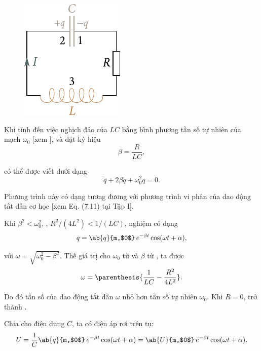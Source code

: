 \begin{figure}[t]
	\begin{center}
		\includegraphics[scale=1]{figures/ch_13/fig_13_3.pdf}
		\caption[]{}
		\label{fig:13_3}
	\end{center}
	\vspace{-0.8cm}
\end{figure}

Khi tính đến việc nghịch đảo của $LC$ bằng bình phương tần số tự nhiên của mạch $\omega_0$ [xem ], và đặt ký hiệu
\begin{equation}\label{eq:13_12}
    \beta = \frac{R}{LC},
\end{equation}

\noindent
{} có thể được viết dưới dạng
\begin{equation}\label{eq:13_13}
    \ddot{q} + 2 \beta \dot{q} + \omega_0^2 q = 0.
\end{equation}

Phương trình này có dạng tương đương với phương trình vi phân của dao động tắt dần cơ học [xem Eq. (7.11) tại Tập I].

Khi $\beta^2<\omega_0^2$, \ie, $R^2/(4L^2)<1/(LC)$, nghiệm  có dạng
\begin{equation}\label{eq:13_14}
    q = \ab{q}{m,$0$}\, e^{-\beta t} \cos(\omega t + \alpha),
\end{equation}

\noindent
với $\omega=\sqrt{\omega_0^2-\beta^2}$.
Thế giá trị cho $\omega_0$ từ  và $\beta$ từ , ta được
\begin{equation}\label{eq:13_15}
    \omega = \parenthesis{ \frac{1}{LC} - \frac{R^2}{4L^2} }.
\end{equation}

\noindent
Do đó tần số của dao động tắt dần $\omega$ nhỏ hơn tần số tự nhiên $\omega_0$.
Khi  $R=0$,  trở thành .

Chia  cho điện dung $C$, ta có điện áp rơi trên tụ:
\begin{equation}\label{eq:13_16}
    U = \frac{1}{C} \ab{q}{m,$0$}\, e^{-\beta t} \cos(\omega t + \alpha) = \ab{U}{m,$0$}\, e^{-\beta t} \cos(\omega t + \alpha).
\end{equation}

